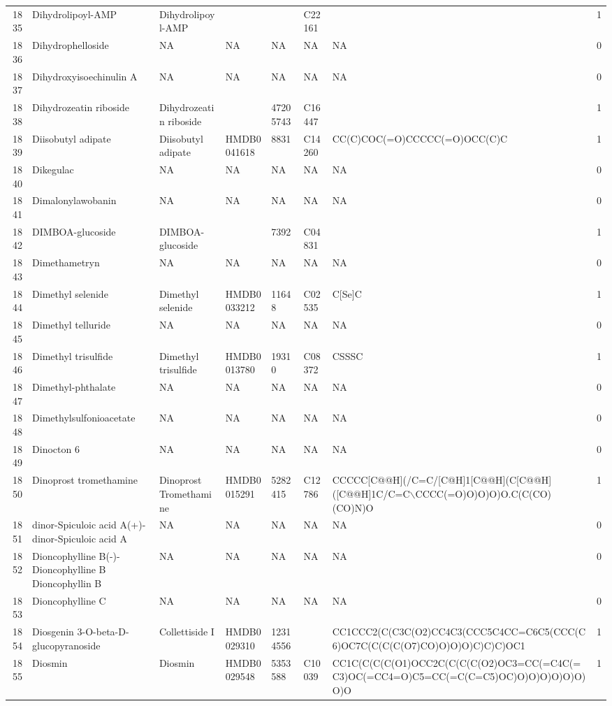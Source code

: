 \documentclass[a4paper]{article}
\begin{document}
\begin{longtable}{rlllllll}
  1835 & Dihydrolipoyl-AMP & Dihydrolipoyl-AMP &  &  & C22161 &  & 1 \\ 
  1836 & Dihydrophelloside & NA & NA & NA & NA & NA & 0 \\ 
  1837 & Dihydroxyisoechinulin A & NA & NA & NA & NA & NA & 0 \\ 
  1838 & Dihydrozeatin riboside & Dihydrozeatin riboside &  & 47205743 & C16447 &  & 1 \\ 
  1839 & Diisobutyl adipate & Diisobutyl adipate & HMDB0041618 & 8831 & C14260 & CC(C)COC(=O)CCCCC(=O)OCC(C)C & 1 \\ 
  1840 & Dikegulac & NA & NA & NA & NA & NA & 0 \\ 
  1841 & Dimalonylawobanin & NA & NA & NA & NA & NA & 0 \\ 
  1842 & DIMBOA-glucoside & DIMBOA-glucoside &  & 7392 & C04831 &  & 1 \\ 
  1843 & Dimethametryn & NA & NA & NA & NA & NA & 0 \\ 
  1844 & Dimethyl selenide & Dimethyl selenide & HMDB0033212 & 11648 & C02535 & C[Se]C & 1 \\ 
  1845 & Dimethyl telluride & NA & NA & NA & NA & NA & 0 \\ 
  1846 & Dimethyl trisulfide & Dimethyl trisulfide & HMDB0013780 & 19310 & C08372 & CSSSC & 1 \\ 
  1847 & Dimethyl-phthalate & NA & NA & NA & NA & NA & 0 \\ 
  1848 & Dimethylsulfonioacetate & NA & NA & NA & NA & NA & 0 \\ 
  1849 & Dinocton 6 & NA & NA & NA & NA & NA & 0 \\ 
  1850 & Dinoprost tromethamine & Dinoprost Tromethamine & HMDB0015291 & 5282415 & C12786 & CCCCC[C@@H](/C=C/[C@H]1[C@@H](C[C@@H]([C@@H]1C/C=C$\backslash$CCCC(=O)O)O)O)O.C(C(CO)(CO)N)O & 1 \\ 
  1851 & dinor-Spiculoic acid A(+)-dinor-Spiculoic acid A & NA & NA & NA & NA & NA & 0 \\ 
  1852 & Dioncophylline B(-)-Dioncophylline B Dioncophyllin B & NA & NA & NA & NA & NA & 0 \\ 
  1853 & Dioncophylline C & NA & NA & NA & NA & NA & 0 \\ 
  1854 & Diosgenin 3-O-beta-D-glucopyranoside & Collettiside I & HMDB0029310 & 12314556 &  & CC1CCC2(C(C3C(O2)CC4C3(CCC5C4CC=C6C5(CCC(C6)OC7C(C(C(C(O7)CO)O)O)O)C)C)C)OC1 & 1 \\ 
  1855 & Diosmin & Diosmin & HMDB0029548 & 5353588 & C10039 & CC1C(C(C(C(O1)OCC2C(C(C(C(O2)OC3=CC(=C4C(=C3)OC(=CC4=O)C5=CC(=C(C=C5)OC)O)O)O)O)O)O)O)O & 1 \\ 

\end{longtable}
\end{document}
